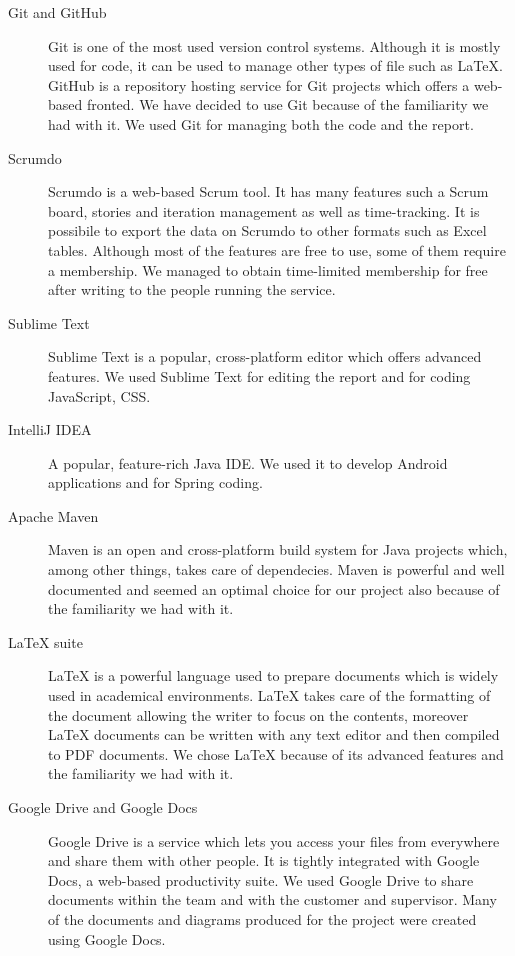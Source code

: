 \begin{description}

\item[Git and GitHub]
Git is one of the most used version control systems. Although it is mostly used for code, it can be used to manage other types of file such as LaTeX. GitHub is a repository hosting service for Git projects which offers a web-based fronted. We have decided to use Git because of the familiarity we had with it. We used Git for managing both the code and the report.

\item[Scrumdo]
Scrumdo is a web-based Scrum tool. It has many features such a Scrum board, stories and iteration management as well as time-tracking.
It is possibile to export the data on Scrumdo to other formats such as Excel tables. Although most of the features are free to use, some of them require a membership. We managed to obtain time-limited membership for free after writing to the people running the service.

\item[Sublime Text]
Sublime Text is a popular, cross-platform editor which offers advanced features.
We used Sublime Text for editing the report and for coding JavaScript, CSS.

\item[IntelliJ IDEA]
A popular, feature-rich Java IDE. We used it to develop Android applications and for Spring coding.

\item[Apache Maven]
Maven is an open and cross-platform build system for Java projects which, among other things, takes care of dependecies. Maven is powerful and well documented and seemed an optimal choice for our project also because of the familiarity we had with it.

\item[LaTeX suite]
LaTeX is a powerful language used to prepare documents which is widely used in academical environments. LaTeX takes care of the formatting of the document allowing the writer to focus on the contents, moreover LaTeX documents can be written with any text editor and then compiled to PDF documents. We chose LaTeX because of its advanced features and the familiarity we had with it.

\item[Google Drive and Google Docs]
Google Drive is a service which lets you access your files from everywhere and share them with other people. It is tightly integrated with Google Docs, a web-based productivity suite. We used Google Drive to share documents within the team and with the customer and supervisor.
Many of the documents and diagrams produced for the project were created using Google Docs.


\end{description}
